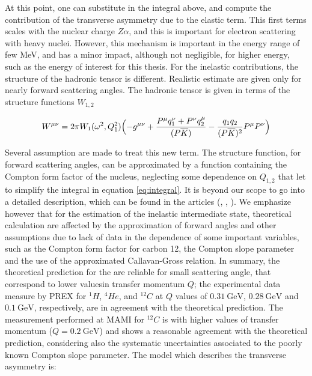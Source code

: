 At this point, one can substitute in the integral above, and compute the contribution of the transverse asymmetry due to the elastic term. This first terms scales with the nuclear charge $Z\alpha$, and this is important for electron scattering with heavy nuclei. However, this mechanism is important in the energy range of few MeV, and has a minor impact, although not negligible, for higher energy, such as the energy of interest for this thesis.
For the inelastic contributions, the structure of the hadronic tensor is different. Realistic estimate are given only for nearly forward scattering angles. The hadronic tensor is given in terms of the structure functions $W_{1,2}$

\begin{equation}
W^{\mu \nu} = 2 \pi W_{1}(\omega^{2},Q_{1}^{2}) \Bigl( -g^{\mu \nu} + \dfrac{P^{\mu}q_{1}^{\nu} +  P^{\nu}q_{2}^{\mu}}{(P \overline{K})} - \dfrac{q_{1} q_{2}}{(P \overline{K})^{2}}P^{\mu}P^{\nu} \Bigl)
\end{equation}

Several assumption are made to treat this new term. The structure function, for forward scattering angles, can be approximated by a function containing the Compton form factor of the nucleus, neglecting some dependence on $Q_{1,2}$ that let to simplify the integral in equation \ref{eq:integral}. It is beyond our scope to go into a detailed description, which can be found in the articles (\cite{Gorchtein_2006}, \cite{Gorchtein_2008}, \cite{Koshchii_2021}). We emphasize however that for the estimation of the inelastic intermediate state, theoretical calculation are affected by the approximation of forward angles and other assumptions due to lack of data in the dependence of some important variables, such as the Compton form factor for carbon 12, the Compton slope parameter and the use of the approximated Callavan-Gross relation. In summary, the theoretical prediction for the \transv are reliable for small scattering angle, that correspond to lower values ​​in transfer momentum $Q$; the experimental data measure by PREX \cite{HAPPEX:2012fud} for $^{1}H$, $^{4}He$, and $^{12}C$ at $Q$ values of $\SI{0.31}{\giga \electronvolt}$, $\SI{0.28}{\giga \electronvolt}$ and $\SI{0.1}{\giga \electronvolt}$, respectively, are in agreement with the theoretical prediction. The measurement performed at MAMI for $^{12}C$ \cite{Esser:2018vdp} is with higher values of transfer momentum ($Q = \SI{0.2}{\giga \electronvolt}$) and shows a reasonable agreement with the theoretical prediction, considering also the systematic uncertainties associated to the poorly known Compton slope parameter. The model which describes the transverse asymmetry is:

